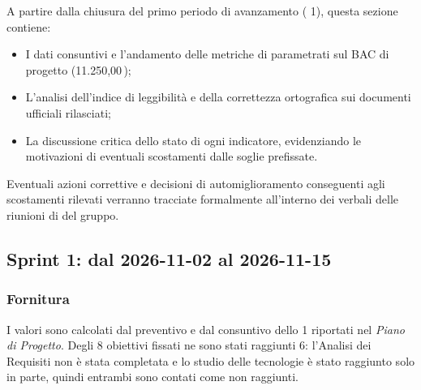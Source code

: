 \documentclass[documento]{gpt}
\begin{document}
A partire dalla chiusura del primo periodo di avanzamento ( 1), questa sezione contiene:
\begin{itemize}
    \item I dati consuntivi e l'andamento delle metriche di  parametrati sul BAC di progetto (11.250,00\,\texteuro);
    \item L'analisi dell'indice di leggibilità e della correttezza ortografica sui documenti ufficiali rilasciati;
    \item La discussione critica dello stato di ogni indicatore, evidenziando le motivazioni di eventuali scostamenti dalle soglie prefissate.
\end{itemize}
Eventuali azioni correttive e decisioni di automiglioramento conseguenti agli scostamenti rilevati verranno tracciate formalmente all'interno dei verbali delle riunioni di  del gruppo.

\subsection{Sprint 1: dal 2026-11-02 al 2026-11-15}

\subsubsection{Fornitura}
I valori sono calcolati dal preventivo e dal consuntivo dello  1 riportati nel \textit{Piano di Progetto}. Degli 8 obiettivi fissati ne sono stati raggiunti 6: l'Analisi dei Requisiti non è stata completata e lo studio delle tecnologie è stato raggiunto solo in parte, quindi entrambi sono contati come non raggiunti.
\end{document}
